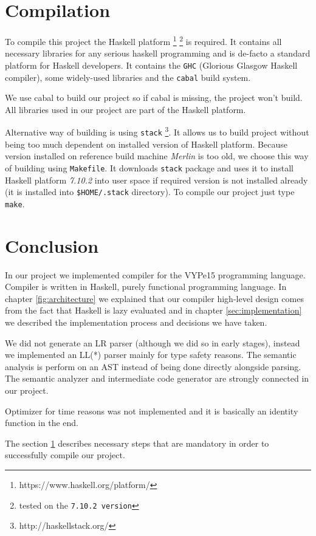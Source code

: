 \documentclass[titlepage]{article}
\begin{document}
\section{Compilation}
\label{sec:compilation}
To compile this project the Haskell platform \footnote{https://www.haskell.org/platform/}
\footnote{tested on the \texttt{7.10.2 version}}
is required. It contains all necessary libraries for any serious haskell programming
and is de-facto a standard platform for Haskell developers. It contains the \texttt{GHC}
(Glorious Glasgow
Haskell compiler), some widely-used libraries and the \texttt{cabal} build system.

We use cabal to build our project so if cabal is missing, the project won't build.
All libraries used in our project are part of the Haskell platform.

Alternative way of building is using \texttt{stack} \footnote{http://haskellstack.org/}.
It allows us to build project without being too much dependent on installed version of
Haskell platform. Because version installed on reference build machine \textit{Merlin}
is too old, we choose this way of building using \texttt{Makefile}.
It downloads \texttt{stack} package and uses it to install Haskell platform \textit{7.10.2}
into user space if required version is not installed already (it is installed into
\texttt{\$HOME/.stack} directory).
To compile our project just type \texttt{make}.

\section{Conclusion}
In our project we implemented compiler for the VYPe15 programming language. Compiler
is written in Haskell, purely functional programming language. In chapter
\ref{fig:architecture} we explained that our compiler high-level design comes from the
fact
that Haskell is lazy evaluated and in chapter \ref{sec:implementation} we described the
implementation process and decisions we have taken.

We did not generate an LR parser (although we did so in early stages), instead we
implemented an LL(*) parser mainly for type safety reasons. The semantic analysis is
perform on an AST instead of being done directly alongside parsing. The semantic analyzer
and intermediate code generator are strongly connected in our project.

Optimizer for time reasons was not implemented and it is basically an identity
function in the end.

The section \ref{sec:compilation} describes necessary steps that are mandatory in order
to successfully compile our project.

\newpage


\end{document}
